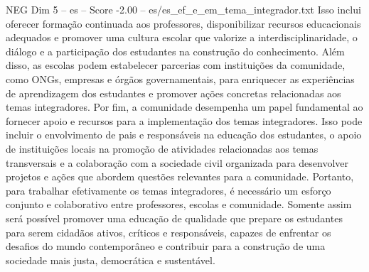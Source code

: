 \begin{textsample}{NEG Dim 5 – es – Score -2.00 – es/es\_ef\_e\_em\_tema\_integrador.txt}
Isso inclui oferecer formação continuada aos professores, disponibilizar recursos educacionais adequados e promover uma cultura escolar que valorize a interdisciplinaridade, o diálogo e a participação dos estudantes na construção do conhecimento.
Além disso, as escolas podem estabelecer parcerias com instituições da comunidade, como ONGs, empresas e órgãos governamentais, para enriquecer as experiências de aprendizagem dos estudantes e promover ações concretas relacionadas aos temas integradores.
Por fim, a comunidade desempenha um papel fundamental ao fornecer apoio e recursos para a implementação dos temas integradores.
Isso pode incluir o envolvimento de pais e responsáveis na educação dos estudantes, o apoio de instituições locais na promoção de atividades relacionadas aos temas transversais e a colaboração com a sociedade civil organizada para desenvolver projetos e ações que abordem questões relevantes para a comunidade.
Portanto, para trabalhar efetivamente os temas integradores, é necessário um esforço conjunto e colaborativo entre professores, escolas e comunidade.
Somente assim será possível promover uma educação de qualidade que prepare os estudantes para serem cidadãos ativos, críticos e responsáveis, capazes de enfrentar os desafios do mundo contemporâneo e contribuir para a construção de uma sociedade mais justa, democrática e sustentável.

\end{textsample}
